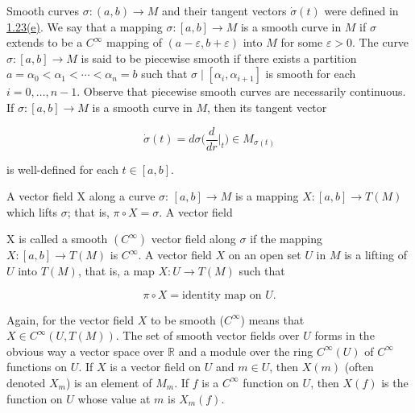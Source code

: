 \begin{definition}\label{thm:1.41}
	Smooth curves $\sigma: (a,b) \to M$ and their tangent vectors $\dot{\sigma}(t)$ were defined in \hyperref[thm:1.23]{1.23(e)}. We say that a mapping $\sigma: [a,b] \to M$ is a smooth curve in $M$ if $\sigma$ extends to be a $C^\infty$ mapping of $(a-\varepsilon, b+\varepsilon)$ into $M$ for some $\varepsilon > 0$. The curve $\sigma: [a,b] \to M$ is said to be piecewise smooth if there exists a partition $a = \alpha_0 < \alpha_1 < \cdots < \alpha_n = b$ such that $\sigma \mid [\alpha_i, \alpha_{i+1}]$ is smooth for each $i = 0, \ldots, n-1$. Observe that piecewise smooth curves are necessarily continuous. If $\sigma: [a,b] \to M$ is a smooth curve in $M$, then its tangent vector 

	\[
		\dot{\sigma}(t)=d\sigma\biggl(\frac{d}{d r}\biggl|_{t}\biggr)\in M_{\sigma(t)}
	\]

	is well-defined for each  $ t \in [a, b] $.

\end{definition}

\begin{definition}\label{thm:1.42}
	A vector field X along a curve  $ \sigma $:  $ [a,b] \to M $ is a mapping  $ X\colon [a,b] \to T(M) $ which lifts  $ \sigma $; that is,  $ \pi \circ X = \sigma $. A vector field

	\begin{center}
	\end{center}

	X is called a smooth $(C^{\infty})$ vector field along $\sigma$ if the mapping $X\colon[a,b]\to T(M)$ is $C^{\infty}$. A vector field $X$ on an open set $U$ in $M$ is a lifting of $U$ into $T(M)$, that is, a map $X\colon U\to T(M)$ such that 

	\[
		\pi\circ X=\text{identity map on }U.
	\]

	Again, for the vector field $X$ to be smooth ($C^\infty$) means that $X \in C^\infty(U, T(M))$. The set of smooth vector fields over $U$ forms in the obvious way a vector space over $\mathbb{R}$ and a module over the ring $C^\infty(U)$ of $C^\infty$ functions on $U$. If $X$ is a vector field on $U$ and $m \in U$, then $X(m)$ (often denoted $X_m$) is an element of $M_m$. If $f$ is a $C^\infty$ function on $U$, then $X(f)$ is the function on $U$ whose value at $m$ is $X_m(f)$.

\end{definition}

